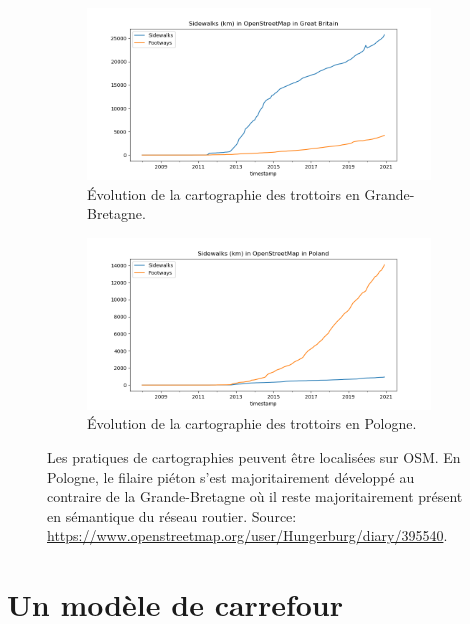 \begin{figure}[ht]
    \centering
    \begin{subfigure}[t]{.49\linewidth}
        \includegraphics[width=\textwidth]{images/modelisation/Sidewalks-Length-Britain.png}
        \caption{Évolution de la cartographie des trottoirs en Grande-Bretagne.\label{fig:modelisation_osm_gb}}
    \end{subfigure}
    \begin{subfigure}[t]{.49\linewidth}
        \includegraphics[width=\textwidth]{images/modelisation/Sidewalks-Length-Poland.png}
        \caption{Évolution de la cartographie des trottoirs en Pologne. \label{fig:modelisation_osm_pologne}}
    \end{subfigure}
    \caption[Variation des pratiques de contribution sur OpenStreetMap]{Les pratiques de cartographies peuvent être localisées sur OSM. En Pologne, le filaire piéton s'est majoritairement développé au contraire de la Grande-Bretagne où il reste majoritairement présent en sémantique du réseau routier. Source: \url{https://www.openstreetmap.org/user/Hungerburg/diary/395540}.}
    \label{fig:modelisation_osm_gb_pologne}
\end{figure}

\section{Un modèle de carrefour}

